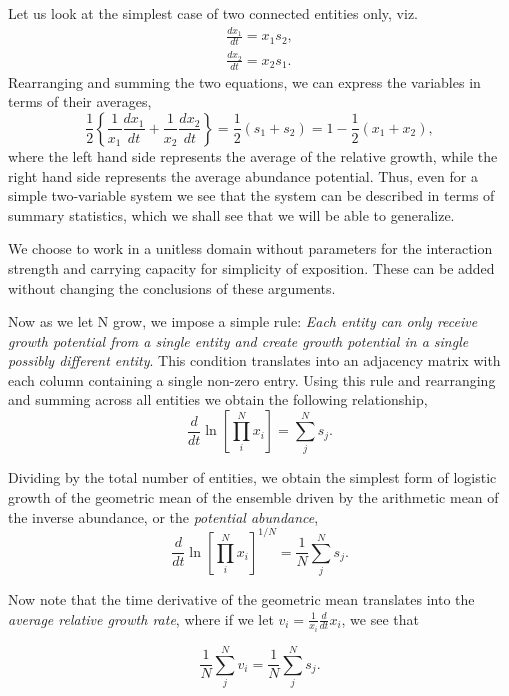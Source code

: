 \documentclass{article}
\begin{document}
Let us look at the simplest case of two connected entities only, viz.
\begin{eqnarray}
\frac{d x_1}{dt} = x_1 s_2, \\
\frac{d x_2}{dt} = x_2 s_1.
\end{eqnarray}
Rearranging and summing the two equations, we can express the variables in terms of their averages,
\begin{equation}
\frac{1}{2} \left\{\frac{1}{x_1}\frac{d x_1}{dt} + \frac{1}{x_2}\frac{d x_2}{dt}\right\} = \frac{1}{2}(s_1 + s_2) = 1 - \frac{1}{2}(x_1 + x_2),
\end{equation}
where the left hand side represents the average of the relative growth, while the right hand side represents the average abundance potential. Thus, even for a simple two-variable system we see that the system can be described in terms of summary statistics, which we shall see that we will be able to generalize.

We choose to work in a unitless domain without parameters for the interaction strength and carrying capacity for simplicity of exposition. These can be added without changing the conclusions of these arguments. 

Now as we let N grow, we impose a simple rule: \textit{Each entity can only receive growth potential from a single entity and create growth potential in a single possibly different entity}. This condition translates into an adjacency matrix with each column containing a single non-zero entry. 
Using this rule and rearranging and summing across all entities we obtain the following relationship,
\begin{equation}
\label{eq:modSIR22}
\frac{d}{dt} \ln \left[ \prod_i^N x_i \right ] = \sum_j^N s_{j}.
\end{equation}

Dividing by the total number of entities, we obtain the simplest form of logistic growth of the geometric mean of the ensemble driven by the arithmetic mean of the inverse abundance, or the \textit{potential abundance}, 
\begin{equation}
\label{eq:modSIR3}
\frac{d}{dt} \ln \left[ \prod_i^N x_i \right ]^{1/N} = \frac{1}{N}\sum_j^N s_j.
\end{equation}

Now note that the time derivative of the geometric mean translates into the \textit{average relative growth rate}, where if we let $v_i=\frac{1}{x_i}\frac{d}{dt}x_i$, we see that

\begin{equation}
\label{eq:modSIR4}
\frac{1}{N}\sum_j^N v_i = \frac{1}{N}\sum_j^N s_j.
\end{equation}
\end{document}
